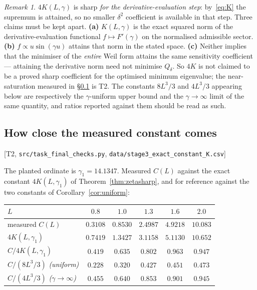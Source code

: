\documentclass[11pt,a4paper]{article}
\theoremstyle{definition}
\theoremstyle{remark}
\newtheorem{remark}[theorem]{Remark}
\newcommand{\tier}[1]{{\small\textsf{[#1]}}}
\newcommand{\src}[1]{{\footnotesize\texttt{#1}}}
\begin{document}
\begin{remark}\label{rem:twoconstants}
$4K(L,\gamma)$ is sharp \emph{for the derivative-evaluation step}: by~\eqref{eq:K} the
supremum is attained, so no smaller $\delta^{2}$ coefficient is available in that step. Three
claims must be kept apart. \textbf{(a)} $K(L,\gamma)$ is the exact squared norm of the
derivative-evaluation functional $f\mapsto F'(\gamma)$ on the normalised admissible sector.
\textbf{(b)} $f\propto u\sin(\gamma u)$ attains that norm in the stated space. \textbf{(c)}
Neither implies that the minimiser of the \emph{entire} Weil form attains the same sensitivity
coefficient --- attaining the derivative norm need not minimise $Q_\delta$. So $4K$ is not
claimed to be a proved sharp coefficient for the optimised minimum eigenvalue; the
near-saturation measured in \S\ref{sec:sat} is T2. The constants $8L^{3}/3$ and $4L^{3}/3$
appearing below are respectively the $\gamma$-uniform upper bound and the $\gamma\to\infty$
limit of the same quantity, and ratios reported against them should be read as such.
\end{remark}

\subsection{How close the measured constant comes}\label{sec:sat}
\tier{T2, \src{src/task\_final\_checks.py}, \src{data/stage3\_exact\_constant\_K.csv}}

The planted ordinate is $\gamma_1=14.1347$. Measured $C(L)$ against the exact constant
$4K(L,\gamma_1)$ of Theorem~\ref{thm:zetasharp}, and for reference against the two
constants of Corollary~\ref{cor:uniform}:

\begin{center}
\begin{tabular}{@{}lccccc@{}}
\toprule
$L$ & $0.8$ & $1.0$ & $1.3$ & $1.6$ & $2.0$ \\
\midrule
measured $C(L)$ & $0.3108$ & $0.8530$ & $2.4987$ & $4.9218$ & $10.083$ \\
$4K(L,\gamma_1)$ & $0.7419$ & $1.3427$ & $3.1158$ & $5.1130$ & $10.652$ \\
$C/4K(L,\gamma_1)$ & $0.419$ & $0.635$ & $0.802$ & $\mathbf{0.963}$ & $0.947$ \\[2pt]
$C/(8L^{3}/3)$ \emph{(uniform)} & $0.228$ & $0.320$ & $0.427$ & $0.451$ & $0.473$ \\
$C/(4L^{3}/3)$ \emph{($\gamma\to\infty$)} & $0.455$ & $0.640$ & $0.853$ & $0.901$ & $0.945$ \\
\bottomrule
\end{tabular}
\end{center}
\end{document}
